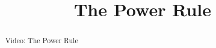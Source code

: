 \documentclass[handout]{ximera}
\title{The Power Rule}
\begin{document}
\begin{abstract} Video: The Power Rule %
\end{abstract}

\maketitle

\end{document}
